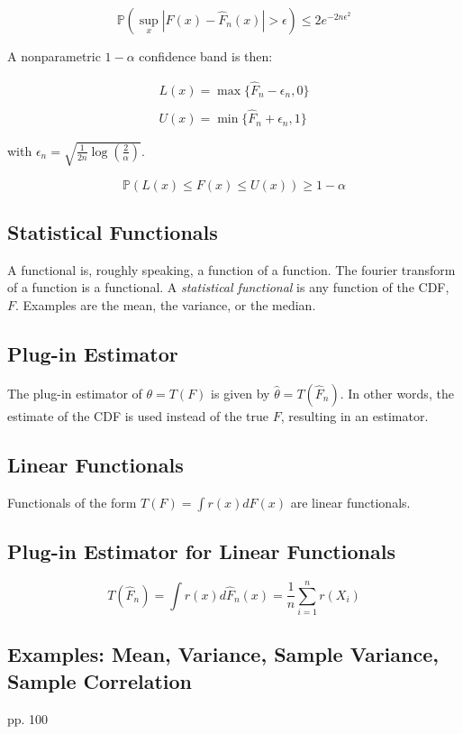 \begin{equation}
\mathbb{P}\left(\sup_x|F(x) - \hat{F}_n(x)|>\epsilon \right)\leq 2 e^{-2n\epsilon^2}
\end{equation}

A nonparametric $1-\alpha$ confidence band is then:

\begin{equation}
\begin{array}{c}
L(x) = \max\{\hat{F}_n -\epsilon_n, 0 \}\\
\\
U(x) = \min\{\hat{F}_n + \epsilon_n, 1\}
\end{array}
\end{equation}

with $\epsilon_n = \sqrt{\frac{1}{2n}\log\left(\frac{2}{\alpha}\right)}$.

\begin{equation}
\mathbb{P}\left(L(x) \leq F(x) \leq U(x) \right) \geq 1-\alpha
\end{equation}
	


\subsection{Statistical Functionals}
A functional is, roughly speaking, a function of a function. The fourier transform of a function is a functional. A \textit{statistical functional} is any function of the CDF, $F$. Examples are the mean, the variance, or the median. 

\subsection{Plug-in Estimator}
The plug-in estimator of $\theta = T(F)$ is given by $\hat{\theta} = T(\hat{F}_n)$. In other words, the estimate of the CDF is used instead of the true $F$, resulting in an estimator.

\subsection{Linear Functionals}
Functionals of the form $T(F) = \int r(x) dF(x)$ are linear functionals.  

\subsection{Plug-in Estimator for Linear Functionals}
\begin{equation}
T(\hat{F}_n) = \int r(x) d\hat{F}_n(x) = \frac{1}{n}\sum^{n}_{i=1}r(X_i)
\end{equation}

\subsection{Examples: Mean, Variance, Sample Variance, Sample Correlation}
 pp. 100
